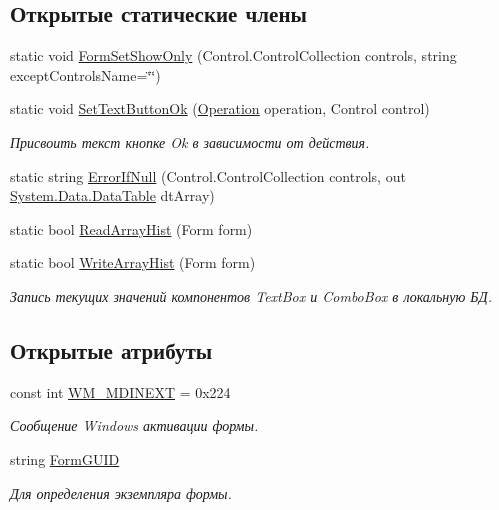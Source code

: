 \subsection*{Открытые статические члены}
\begin{DoxyCompactItemize}
\item 
static void \mbox{\hyperlink{class_f_b_a_1_1_form_obj_a3aa92458d9f312e35e965d9a7ff7d4a5}{Form\+Set\+Show\+Only}} (Control.\+Control\+Collection controls, string except\+Controls\+Name=\char`\"{}\char`\"{})
\item 
static void \mbox{\hyperlink{class_f_b_a_1_1_form_obj_adbfec2d82d4f37f122d0f910a8545e65}{Set\+Text\+Button\+Ok}} (\mbox{\hyperlink{namespace_f_b_a_a82a9536170086556d110a52b7698a776}{Operation}} operation, Control control)
\begin{DoxyCompactList}\small\item\em Присвоить текст кнопке Ok в зависимости от действия. \end{DoxyCompactList}\item 
static string \mbox{\hyperlink{class_f_b_a_1_1_form_obj_a206880e9e37a593cb85a5b2053320056}{Error\+If\+Null}} (Control.\+Control\+Collection controls, out \mbox{\hyperlink{_sys_static_8cs_a6542cfcff2f8e81f06ade15aa0bfe2b7}{System.\+Data.\+Data\+Table}} dt\+Array)
\item 
static bool \mbox{\hyperlink{class_f_b_a_1_1_form_obj_a2c37fc474e6c5dee9aabca7c07036e26}{Read\+Array\+Hist}} (Form form)
\item 
static bool \mbox{\hyperlink{class_f_b_a_1_1_form_obj_ab2c956c7f0f94bccd3d7e9d78dc1203c}{Write\+Array\+Hist}} (Form form)
\begin{DoxyCompactList}\small\item\em Запись текущих значений компонентов Text\+Box и Combo\+Box в локальную БД. \end{DoxyCompactList}\end{DoxyCompactItemize}
\subsection*{Открытые атрибуты}
\begin{DoxyCompactItemize}
\item 
const int \mbox{\hyperlink{class_f_b_a_1_1_form_obj_a56e2e8df8ac5bc6aefee7cac85fe8f73}{W\+M\+\_\+\+M\+D\+I\+N\+E\+XT}} = 0x224
\begin{DoxyCompactList}\small\item\em Сообщение Windows активации формы. \end{DoxyCompactList}\item 
string \mbox{\hyperlink{class_f_b_a_1_1_form_obj_ada411dc21f16811bd9ba9e940713a275}{Form\+G\+U\+ID}}
\begin{DoxyCompactList}\small\item\em Для определения экземпляра формы. ~\newline
\end{DoxyCompactList}\end{DoxyCompactItemize}
